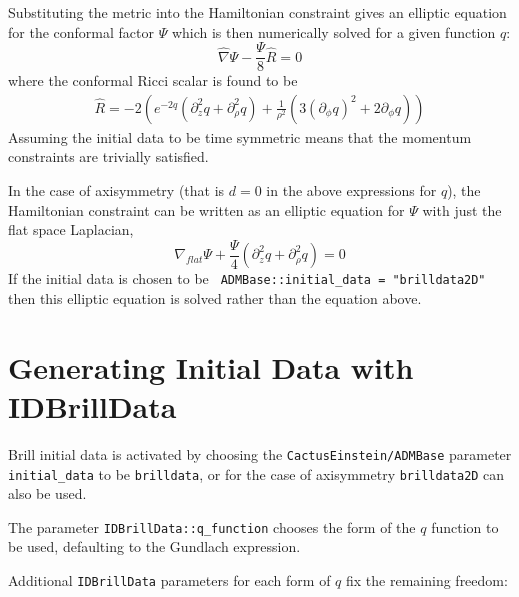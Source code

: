 \documentclass{article}
\begin{document}
Substituting the metric into the Hamiltonian constraint gives an
elliptic equation for the conformal factor $\Psi$ which is then
numerically solved for a given function $q$:
\begin{equation}
\hat{\nabla} \Psi - \frac{\Psi}{8} \hat{R} = 0
\end{equation}
where the conformal Ricci scalar is found to be
\begin{eqnarray}
\hat{R} = -2 \left(e^{-2q} (\partial^2_z q + \partial^2_\rho q) + 
\frac{1}{\rho^2} (3 (\partial_\phi q)^2 + 2 \partial_\phi q)\right)
\end{eqnarray}
Assuming the initial data to be time symmetric means that the momentum
constraints are trivially satisfied.

In the case of axisymmetry (that is $d=0$ in the above expressions for
$q$), the Hamiltonian constraint can be written as an elliptic
equation for $\Psi$ with just the flat space Laplacian,
\begin{equation}
\nabla_{flat} \Psi + \frac{\Psi}{4} (\partial_z^2 q + \partial_\rho^2 q) = 0
\end{equation}
If the initial data is chosen to be {\tt
ADMBase::initial\_data = "brilldata2D"} then this elliptic equation
is solved rather than the equation above.


\section{Generating Initial Data with IDBrillData}

Brill initial data is activated by choosing the {\tt CactusEinstein/ADMBase}
parameter {\tt initial\_data} to be {\tt brilldata}, or for the case of
axisymmetry {\tt brilldata2D} can also be used.

The parameter {\tt IDBrillData::q\_function} chooses the form of the
$q$ function to be used, defaulting to the Gundlach expression.

Additional {\tt IDBrillData} parameters for each form of $q$ fix the 
remaining freedom:
\end{document}
